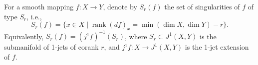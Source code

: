 For a smooth mapping $f: X \to Y$, denote by $S_r(f)$ the set of singularities of $f$ of type $S_r$, i.e.,
$$
S_r(f) = \{ x \in X \mid \operatorname{rank}(df)_x = \min(\dim X, \dim Y) - r \}.
$$
Equivalently, $S_r(f) = (j^1 f)^{-1}(S_r)$, where $S_r \subset J^1(X,Y)$ is the submanifold of 1-jets of corank $r$, and $j^1 f: X \to J^1(X,Y)$ is the 1-jet extension of $f$.
